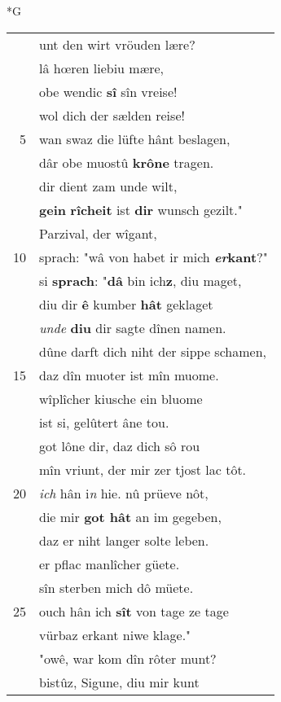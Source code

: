 \documentclass[8pt,a4paper,notitlepage]{article}
\begin{document}
\begin{table}[ht]
\begin{minipage}[t]{0.5\linewidth}
\small
\begin{center}*G
\end{center}
\begin{tabular}{rl}
 & unt den wirt vröuden lære?\\ 
 & lâ hœren liebiu mære,\\ 
 & obe wendic \textbf{sî} sîn vreise!\\ 
 & wol dich der sælden reise!\\ 
5 & wan swaz die lüfte hânt beslagen,\\ 
 & dâr obe muostû \textbf{krône} tragen.\\ 
 & dir dient zam unde wilt,\\ 
 & \textbf{gein} \textbf{rîcheit} ist \textbf{dir} wunsch gezilt."\\ 
 & Parzival, der wîgant,\\ 
10 & sprach: "wâ von habet ir mich \textbf{\textit{er}kant}?"\\ 
 & si \textbf{sprach}: "\textbf{dâ} bin ich\textbf{z}, diu maget,\\ 
 & diu dir \textbf{ê} kumber \textbf{hât} geklaget\\ 
 & \textit{unde} \textbf{diu} dir sagte dînen namen.\\ 
 & dûne darft dich niht der sippe schamen,\\ 
15 & daz dîn muoter ist mîn muome.\\ 
 & wîplîcher kiusche ein bluome\\ 
 & ist si, gelûtert âne tou.\\ 
 & got lône dir, daz dich sô rou\\ 
 & mîn vriunt, der mir zer tjost lac tôt.\\ 
20 & \textit{ich} hân i\textit{n} hie. nû prüeve nôt,\\ 
 & die mir \textbf{got hât} an im gegeben,\\ 
 & daz er niht langer solte leben.\\ 
 & er pflac manlîcher güete.\\ 
 & sîn sterben mich dô müete.\\ 
25 & ouch hân ich \textbf{sît} von tage ze tage\\ 
 & vürbaz erkant niwe klage."\\ 
 & "owê, war kom dîn rôter munt?\\ 
 & bistûz, Sigune, diu mir kunt\\ 

\end{tabular}
\end{minipage}
\end{table}
\end{document}
